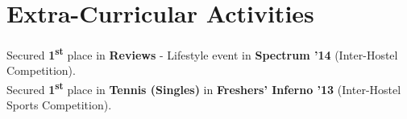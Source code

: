\documentclass[a4paper]{norm-resume}
\begin{document}
\vspace{2mm}	%

\section{Extra-Curricular Activities \hrulefill}

\vspace{2mm} %
	
	Secured \textbf{1\textsuperscript{st}} place in \textbf{Reviews} - Lifestyle event in \textbf{Spectrum '14} (Inter-Hostel Competition).\\
	Secured \textbf{1\textsuperscript{st}} place in \textbf{Tennis (Singles)} in \textbf{Freshers' Inferno '13} (Inter-Hostel Sports Competition).\\	
\end{document}
